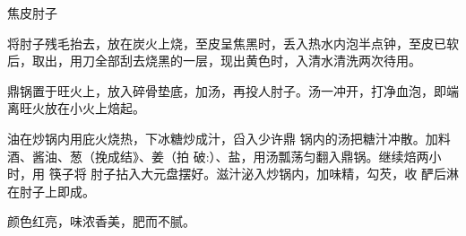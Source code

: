 \begin{recipe}{焦皮肘子}

\ingredients


\cooking

\step 将肘子残毛抬去，放在炭火上烧，至皮呈焦黑时，丢入热水内泡半点钟，至皮已软
后，取出，用刀全部刮去烧黑的一层，现出黄色时，入清水清洗两次待用。

\step 鼎锅置于旺火上，放入碎骨垫底，加汤，再投人肘子。汤一冲开，打净血泡，即端
离旺火放在小火上焙起。

\step 油在炒锅内用庇火烧热，下冰糖炒成汁，舀入少许鼎 锅内的汤把糖汁冲散。加料
酒、酱油、葱（挽成结》、姜（拍 破:）、盐，用汤瓢荡匀翻入鼎锅。继续焙两小时，用
筷子将 肘子拈入大元盘摆好。滋汁泌入炒锅内，加味精，勾芡，收 酽后淋在肘子上即成。

\notes

颜色红亮，味浓香美，肥而不腻。

\end{recipe}

